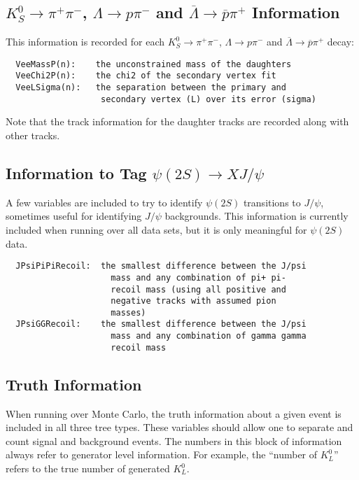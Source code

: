\documentclass[11pt]{article}
\begin{document}
\subsection[$K^0_S\to\pi^+\pi^-$, $\Lambda \to p\pi^-$ and $\overline{\Lambda}\to\overline{p}\pi^+$ Information]{\boldmath $K^0_S\to\pi^+\pi^-$, $\Lambda \to p\pi^-$ and $\overline{\Lambda}\to\overline{p}\pi^+$ Information}

This information is recorded for each $K^0_S\to\pi^+\pi^-$, $\Lambda \to p\pi^-$ and $\overline{\Lambda}\to\overline{p}\pi^+$ decay:
\begin{verbatim}
  VeeMassP(n):    the unconstrained mass of the daughters
  VeeChi2P(n):    the chi2 of the secondary vertex fit
  VeeLSigma(n):   the separation between the primary and 
                   secondary vertex (L) over its error (sigma)
\end{verbatim}
Note that the track information for the daughter tracks are recorded along with other tracks.

\subsection[Information to Tag $\psi(2S)\to XJ/\psi$]{\boldmath Information to Tag $\psi(2S)\to XJ/\psi$}

A few variables are included to try to identify $\psi(2S)$ transitions to $J/\psi$, sometimes useful for identifying $J/\psi$ backgrounds.  This information is currently included when running over all data sets, but it is only meaningful for $\psi(2S)$ data.
\begin{verbatim}
  JPsiPiPiRecoil:  the smallest difference between the J/psi
                     mass and any combination of pi+ pi-
                     recoil mass (using all positive and
                     negative tracks with assumed pion 
                     masses)
  JPsiGGRecoil:    the smallest difference between the J/psi
                     mass and any combination of gamma gamma
                     recoil mass
\end{verbatim}

\subsection{Truth Information}

When running over Monte Carlo, the truth information about a given event is included in all three tree types.  These variables should allow one to separate and count signal and background events.  The numbers in this block of information always refer to generator level information.  For example, the ``number of $K^0_L$'' refers to the true number of generated $K^0_L$.
\end{document}
